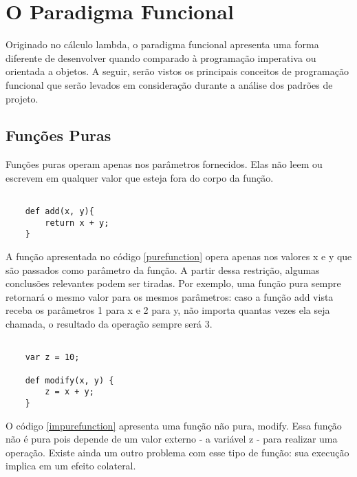 \chapter{O Paradigma Funcional}

Originado no cálculo lambda, o paradigma funcional 
apresenta uma forma diferente de desenvolver quando 
comparado à programação imperativa ou orientada a 
objetos. A seguir, serão vistos os principais 
conceitos de programação funcional que serão 
levados em consideração durante a análise dos 
padrões de projeto.

\section{Funções Puras}

Funções puras operam apenas nos parâmetros fornecidos. 
Elas não leem ou escrevem em qualquer valor que esteja 
fora do corpo da função\cite{purefunctionscala, functionalscala}.

\begin{lstlisting}[caption={Exemplo de Função Pura},label=purefunction]

    def add(x, y){
        return x + y;
    }

\end{lstlisting}

A função apresentada no código \ref{purefunction} 
opera apenas nos valores x e y que 
são passados como parâmetro da função. A partir 
dessa restrição, algumas conclusões relevantes podem 
ser tiradas. Por exemplo, uma função pura sempre 
retornará o mesmo valor para os mesmos parâmetros: 
caso a função add vista receba os parâmetros 1 para x 
e 2 para y, não importa quantas vezes ela seja chamada, 
o resultado da operação sempre será 3\cite{functionalscala}.

\begin{lstlisting}[caption={Exemplo de Função Pura},label=impurefunction]

    var z = 10;

    def modify(x, y) {
        z = x + y;
    }

\end{lstlisting}

O código \ref{impurefunction} apresenta uma função 
não pura, modify. Essa função não é pura pois 
depende de um valor externo - a variável z - para 
realizar uma operação. Existe ainda um outro problema 
com esse tipo de função: sua execução implica em 
um efeito colateral.

